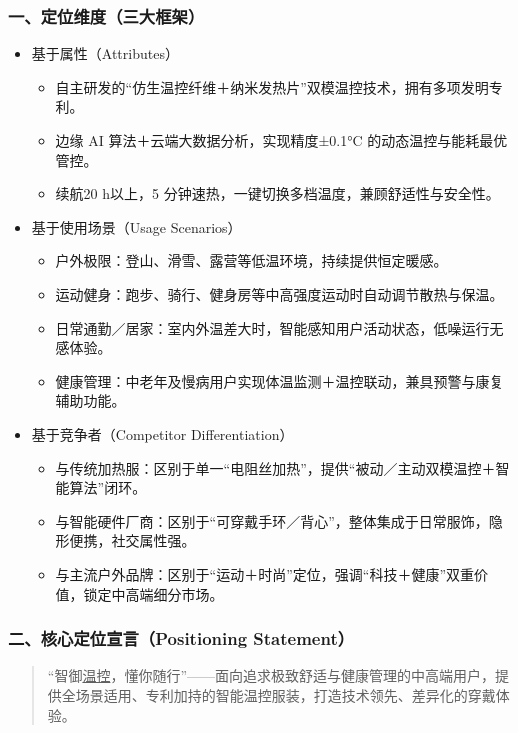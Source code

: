 \documentclass[UTF8]{report}
\theoremstyle{MyLineTheoremStyle} %
\theoremstyle{MyBlockTheoremStyle} %
\theoremstyle{MySubsubsectionStyle} %
\begin{document}
  \subsubsection{一、定位维度（三大框架）}
    \begin{itemize}
      \item 基于属性（Attributes）  
        \begin{itemize}
          \item 自主研发的“仿生温控纤维＋纳米发热片”双模温控技术，拥有多项发明专利。  
          \item 边缘 AI 算法＋云端大数据分析，实现精度±0.1°C 的动态温控与能耗最优管控。  
          \item 续航20 h以上，5 分钟速热，一键切换多档温度，兼顾舒适性与安全性。  
        \end{itemize}

      \item 基于使用场景（Usage Scenarios）  
        \begin{itemize}
          \item 户外极限：登山、滑雪、露营等低温环境，持续提供恒定暖感。  
          \item 运动健身：跑步、骑行、健身房等中高强度运动时自动调节散热与保温。  
          \item 日常通勤／居家：室内外温差大时，智能感知用户活动状态，低噪运行无感体验。  
          \item 健康管理：中老年及慢病用户实现体温监测＋温控联动，兼具预警与康复辅助功能。  
        \end{itemize}

      \item 基于竞争者（Competitor Differentiation）  
        \begin{itemize}
          \item 与传统加热服：区别于单一“电阻丝加热”，提供“被动／主动双模温控＋智能算法”闭环。  
          \item 与智能硬件厂商：区别于“可穿戴手环／背心”，整体集成于日常服饰，隐形便携，社交属性强。  
          \item 与主流户外品牌：区别于“运动＋时尚”定位，强调“科技＋健康”双重价值，锁定中高端细分市场。  
        \end{itemize}
    \end{itemize}

  \subsubsection{二、核心定位宣言（Positioning Statement）}
    \begin{quote}
      “智御\underline{温控}，懂你随行”——面向追求极致舒适与健康管理的中高端用户，提供全场景适用、专利加持的智能温控服装，打造技术领先、差异化的穿戴体验。
    \end{quote}
\end{document}
